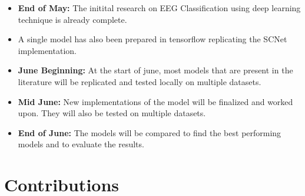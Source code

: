 \documentclass[10pt]{article}
\begin{document}
\begin{itemize}
    \item \textbf{End of May:} The initital research on EEG Classification using deep learning technique is already complete.
    \item A single model has also been prepared in tensorflow replicating the SCNet implementation.
    \item \textbf{June Beginning:} At the start of june, most models that are present in the literature will be replicated and tested locally on multiple datasets.
    \item \textbf{Mid June:} New implementations of the model will be finalized and worked upon. They will also be tested on multiple datasets.
    \item \textbf{End of June:} The models will be compared to find the best performing models and to evaluate the results.
\end{itemize}














\section{Contributions} 
\end{document}

